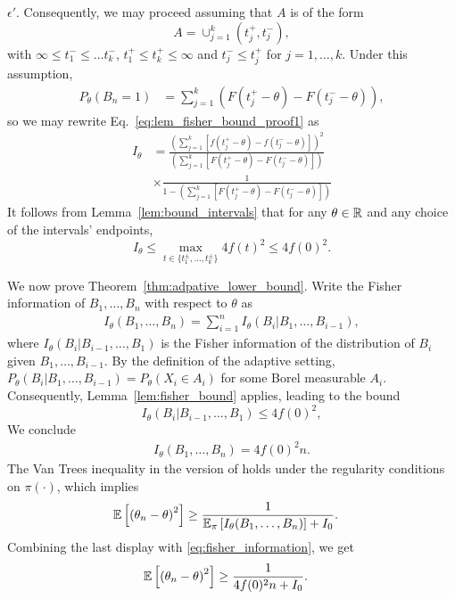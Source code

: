 \begin{proof-of-lemma}[\ref{lem:fisher_bound}]
  $\epsilon'$. Consequently, we may proceed assuming that
  $A$ is of the form
  \begin{equation*}
    A = \cup_{j=1}^k (t^+_j,t^-_j),
  \end{equation*}
  with $\infty \leq t^-_1 \leq \ldots t^-_k$, $t^+_1 \leq t^+_k \leq \infty$ and $t^-_j \leq t^+_j$ for $j=1,\ldots,k$. Under this assumption, 
  \begin{align*}
    P_{\theta}(B_n=1) & = \sum_{j=1}^k \left( F \left(t^+_j-\theta\right) -  F \left(t^-_j-\theta\right)  \right),
  \end{align*}
  so we may rewrite Eq.~\eqref{eq:lem_fisher_bound_proof1} as
  \begin{align*}
    I_\theta & = \frac { \left( \sum_{j=1}^{k} \left[ f \left(t^+_j-\theta \right) - f \left( t^-_j-\theta \right) \right] \right)^2 } 
    { \left( \sum_{j=1}^k \left[ F \left( t^+_j-\theta \right) - F \left( t^-_j-\theta \right) \right] \right) }  \nonumber \\
    & \times \frac {1} 
    {1- \left( \sum_{j=1}^k \left[ F \left(  t^+_j-\theta \right) - F \left( t^-_j-\theta \right) \right] \right) } 
  \end{align*}
  It follows from Lemma~\ref{lem:bound_intervals} that for any $\theta \in \mathbb{R}$ and any choice of the intervals' endpoints,
  \begin{equation*}
    I_\theta \le
    \max_{t \in \{t^\pm_1,\ldots,t^\pm_k\} } 4f(t)^2 \leq 4 f(0)^2. 
  \end{equation*}
\end{proof-of-lemma}

We now prove Theorem~\ref{thm:adpative_lower_bound}. Write the Fisher information of $B_1,\ldots,B_n$ with respect to $\theta$ as 
\begin{align*}
I_\theta(B_1,\ldots,B_n) = \sum_{i=1}^n I_\theta (B_i|B_1,\ldots,B_{i-1}),
\end{align*}
where $I_\theta (B_i|B_{i-1},\ldots,B_1)$ is the Fisher information of the distribution of $B_i$ given $B_1,\ldots,B_{i-1}$. By the definition of the adaptive setting, $P_{\theta}(B_i|B_1,\ldots,B_{i-1}) = P_{\theta}(X_i \in A_i)$ for some Borel measurable $A_i$. Consequently, Lemma~\ref{lem:fisher_bound} applies, leading to the bound
\[
 I_\theta (B_i|B_{i-1},\ldots,B_1) \leq 4f(0)^2,
\]
We conclude
\begin{align}
I_\theta(B_1,\ldots,B_n) = 4f(0)^2 n
\label{eq:fisher_information}.
\end{align}
The Van Trees inequality in the version of 
\cite{gill1995applications} holds under the regularity conditions on $\pi(\cdot)$, which implies
\begin{align*}
\mathbb{E}\left[  \left( \theta_n - \theta \right)^2\right] &  \geq \frac{1}{ \mathbb{E}_{\pi} \left[ I_\theta(B_1,\ldots,B_n)\right] + I_0}.
\end{align*}
Combining the last display with \eqref{eq:fisher_information}, we get
\begin{align*}
\mathbb{E}\left[  \left( \theta_n - \theta \right)^2\right] &  \geq \frac{1}{ 4f(0)^2 n + I_0}.
\end{align*}


